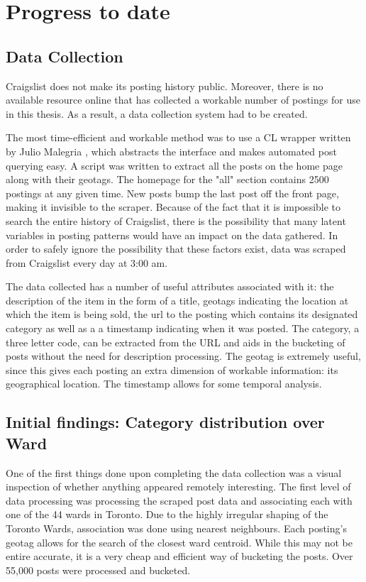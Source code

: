 \documentclass[12pt]{article}
\begin{document}
   \section{Progress to date}

   \subsection{Data Collection}
   Craigslist does not make its posting history public. Moreover, there is no available resource online that has collected a workable number of postings for use in this thesis. As a result, a data collection system had to be created.

   The most time-efficient and workable method was to use a CL wrapper written by Julio Malegria \cite{clwrapper}, which abstracts the interface and makes automated post querying easy. A script was written to extract all the posts on the home page along with their geotags. The homepage for the "all" section contains 2500 postings at any given time. New posts bump the last post off the front page, making it invisible to the scraper. Because of the fact that it is impossible to search the entire history of Craigslist, there is the possibility that many latent variables in posting patterns would have an impact on the data gathered. In order to safely ignore the possibility that these factors exist, data was scraped from Craigslist every day at 3:00 am. 

   The data collected has a number of useful attributes associated with it: the description of the item in the form of a title, geotags indicating the location at which the item is being sold, the url to the posting which contains its designated category as well as a a timestamp indicating when it was posted. The category, a three letter code, can be extracted from the URL and aids in the bucketing of posts without the need for description processing. The geotag is extremely useful, since this gives each posting an extra dimension of workable information: its geographical location. The timestamp allows for some temporal analysis. 

   \subsection{Initial findings: Category distribution over Ward}
   One of the first things done upon completing the data collection was a visual inspection of whether anything appeared remotely interesting. The first level of data processing was processing the scraped post data and associating each with one of the 44 wards in Toronto. Due to the highly irregular shaping of the Toronto Wards, association was done using nearest neighbours. Each posting's geotag allows for the search of the closest ward centroid. While this may not be entire accurate, it is a very cheap and efficient way of bucketing the posts. Over 55,000 posts were processed and bucketed.
\end{document}
